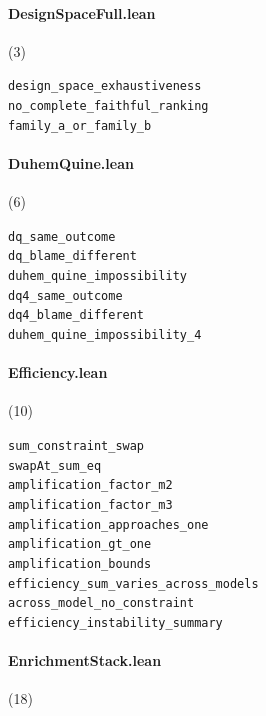 \paragraph{DesignSpaceFull.lean} (3)

{\footnotesize
\texttt{design\_space\_exhaustiveness}\\
\texttt{no\_complete\_faithful\_ranking}\\
\texttt{family\_a\_or\_family\_b}\\
}

\paragraph{DuhemQuine.lean} (6)

{\footnotesize
\texttt{dq\_same\_outcome}\\
\texttt{dq\_blame\_different}\\
\texttt{duhem\_quine\_impossibility}\\
\texttt{dq4\_same\_outcome}\\
\texttt{dq4\_blame\_different}\\
\texttt{duhem\_quine\_impossibility\_4}\\
}

\paragraph{Efficiency.lean} (10)

{\footnotesize
\texttt{sum\_constraint\_swap}\\
\texttt{swapAt\_sum\_eq}\\
\texttt{amplification\_factor\_m2}\\
\texttt{amplification\_factor\_m3}\\
\texttt{amplification\_approaches\_one}\\
\texttt{amplification\_gt\_one}\\
\texttt{amplification\_bounds}\\
\texttt{efficiency\_sum\_varies\_across\_models}\\
\texttt{across\_model\_no\_constraint}\\
\texttt{efficiency\_instability\_summary}\\
}

\paragraph{EnrichmentStack.lean} (18)

